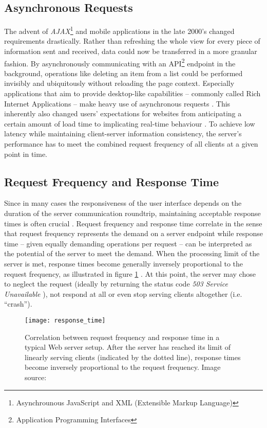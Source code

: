 \subsection{Asynchronous Requests}
The advent of \textit{AJAX}\footnote{Asynchrounous JavaScript and XML (Extensible Markup Language)} and mobile applications in the late 2000's changed requirements drastically. Rather than refreshing the whole view for every piece of information sent and received, data could now be transferred in a more granular fashion. By asynchronously communicating with an API\footnote{Application Programming Interfaces} endpoint in the background, operations like deleting an item from a list could be performed invisibly and ubiquitously without reloading the page context. Especially applications that aim to provide desktop-like capabilities -- commonly called Rich Internet Applications -- make heavy use of asynchronous requests \cite[p. 4]{Sencha2011}. This inherently also changed users' expectations for websites from anticipating a certain amount of load time to implicating real-time behaviour \cite{Garrett2005}. To achieve low latency while maintaining client-server information consistency, the server's performance has to meet the combined request frequency of all clients at a given point in time.

\subsection{Request Frequency and Response Time}
\label{lab:frequency}
Since in many cases the responsiveness of the user interface depends on the duration of the server communication roundtrip, maintaining acceptable response times is often crucial \cite[p. 1]{Nadimpalli2000}. Request frequency and response time correlate in the sense that request frequency represents the demand on a server endpoint while response time -- given equally demanding operations per request -- can be interpreted as the potential of the server to meet the demand. When the processing limit of the server is met, response times become generally inversely proportional to the request frequency, as illustrated in figure \ref{fig:response_time} \cite{response_time}. At this point, the server may chose to neglect the request (ideally by returning the status code \textit{503 Service Unavailable} \cite{http}), not respond at all or even stop serving clients altogether (i.e. ``crash'').

\begin{figure}
\centering\small
\setlength{\tabcolsep}{0mm}
  \texttt{[image: response\_time]}
\caption{
Correlation between request frequency and response time in a typical Web server setup. After the server has reached its limit of linearly serving clients (indicated by the dotted line), response times become inversely proportional to the request frequency. Image source: \cite{response_time}
}
\label{fig:response_time}
\end{figure}

